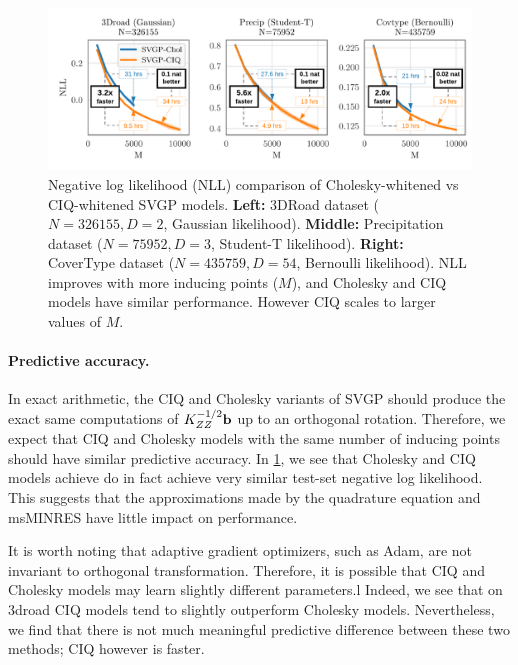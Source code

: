 \begin{figure}[t!]
  \centering
  \includegraphics[width=\linewidth]{figures/variational_nll.pdf}
  \caption[Negative log likelihood (NLL) comparison of Cholesky-whitened vs CIQ-whitened SVGP models.]{
    Negative log likelihood (NLL) comparison of Cholesky-whitened vs CIQ-whitened SVGP models.
    {\bf Left:} 3DRoad dataset ($N=326155, D=2$, Gaussian likelihood).
    {\bf Middle:} Precipitation dataset ($N=75952, D=3$, Student-T likelihood).
    {\bf Right:} CoverType dataset ($N=435759, D=54$, Bernoulli likelihood).
    NLL improves with more inducing points ($M$), and Cholesky and CIQ models have similar performance.
    However CIQ scales to larger values of $M$.
  }
  \label{fig:variational_nll}
\end{figure}

\paragraph{Predictive accuracy.}
In exact arithmetic, the CIQ and Cholesky variants of SVGP should produce the exact same computations of $K_{ZZ}^{-1/2} \mathbf{b}$ up to an orthogonal rotation.
Therefore, we expect that CIQ and Cholesky models with the same number of inducing points should have similar predictive accuracy.
In \cref{fig:variational_nll}, we see that Cholesky and CIQ models achieve do in fact achieve very similar test-set negative log likelihood.
This suggests that the approximations made by the quadrature equation and msMINRES have little impact on performance.

It is worth noting that adaptive gradient optimizers, such as Adam, are not invariant to orthogonal transformation.
Therefore, it is possible that CIQ and Cholesky models may learn slightly different parameters.l
Indeed, we see that on 3droad CIQ models tend to slightly outperform Cholesky models.
Nevertheless, we find that there is not much meaningful predictive difference between these two methods; CIQ however is faster.

